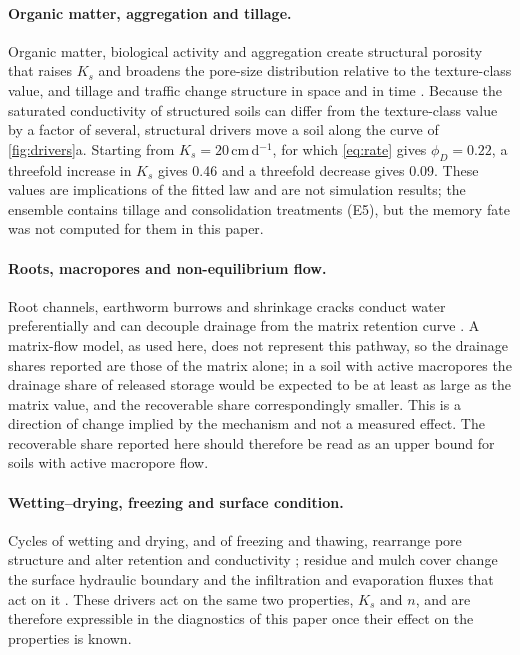 \documentclass[preprint,12pt,authoryear]{elsarticle}
\begin{document}
\paragraph{Organic matter, aggregation and tillage.} Organic matter, biological activity and aggregation create structural porosity that raises $K_s$ and broadens the pore-size distribution relative to the texture-class value, and tillage and traffic change structure in space and in time \citep{Hillel1998,Brady2016,Strudley2008}. Because the saturated conductivity of structured soils can differ from the texture-class value by a factor of several, structural drivers move a soil along the curve of \cref{fig:drivers}a. Starting from $K_s=20$\,cm\,d$^{-1}$, for which \cref{eq:rate} gives $\phi_D=0.22$, a threefold increase in $K_s$ gives 0.46 and a threefold decrease gives 0.09. These values are implications of the fitted law and are not simulation results; the ensemble contains tillage and consolidation treatments (E5), but the memory fate was not computed for them in this paper.

\paragraph{Roots, macropores and non-equilibrium flow.} Root channels, earthworm burrows and shrinkage cracks conduct water preferentially and can decouple drainage from the matrix retention curve \citep{Jarvis2007,Beven1982}. A matrix-flow model, as used here, does not represent this pathway, so the drainage shares reported are those of the matrix alone; in a soil with active macropores the drainage share of released storage would be expected to be at least as large as the matrix value, and the recoverable share correspondingly smaller. This is a direction of change implied by the mechanism and not a measured effect. The recoverable share reported here should therefore be read as an upper bound for soils with active macropore flow.

\paragraph{Wetting--drying, freezing and surface condition.} Cycles of wetting and drying, and of freezing and thawing, rearrange pore structure and alter retention and conductivity \citep{Leuther2021}; residue and mulch cover change the surface hydraulic boundary and the infiltration and evaporation fluxes that act on it \citep{Leuther2026,Vuaille2024}. These drivers act on the same two properties, $K_s$ and $n$, and are therefore expressible in the diagnostics of this paper once their effect on the properties is known.
\end{document}
